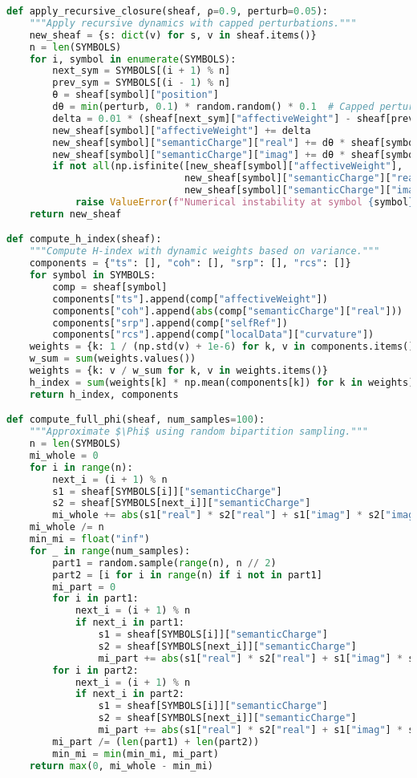 \documentclass[11pt]{article}
\begin{document}
\begin{lstlisting}[language=Python, basicstyle=\small\ttfamily, breaklines=true]
def apply_recursive_closure(sheaf, ρ=0.9, perturb=0.05):
    """Apply recursive dynamics with capped perturbations."""
    new_sheaf = {s: dict(v) for s, v in sheaf.items()}
    n = len(SYMBOLS)
    for i, symbol in enumerate(SYMBOLS):
        next_sym = SYMBOLS[(i + 1) % n]
        prev_sym = SYMBOLS[(i - 1) % n]
        θ = sheaf[symbol]["position"]
        dθ = min(perturb, 0.1) * random.random() * 0.1  # Capped perturbation
        delta = 0.01 * (sheaf[next_sym]["affectiveWeight"] - sheaf[prev_sym]["affectiveWeight"]) * np.cos(θ * ρ)
        new_sheaf[symbol]["affectiveWeight"] += delta
        new_sheaf[symbol]["semanticCharge"]["real"] += dθ * sheaf[symbol]["selfRef"]
        new_sheaf[symbol]["semanticCharge"]["imag"] += dθ * sheaf[symbol]["localData"]["curvature"]
        if not all(np.isfinite([new_sheaf[symbol]["affectiveWeight"],
                               new_sheaf[symbol]["semanticCharge"]["real"],
                               new_sheaf[symbol]["semanticCharge"]["imag"]])):
            raise ValueError(f"Numerical instability at symbol {symbol}")
    return new_sheaf

def compute_h_index(sheaf):
    """Compute H-index with dynamic weights based on variance."""
    components = {"ts": [], "coh": [], "srp": [], "rcs": []}
    for symbol in SYMBOLS:
        comp = sheaf[symbol]
        components["ts"].append(comp["affectiveWeight"])
        components["coh"].append(abs(comp["semanticCharge"]["real"]))
        components["srp"].append(comp["selfRef"])
        components["rcs"].append(comp["localData"]["curvature"])
    weights = {k: 1 / (np.std(v) + 1e-6) for k, v in components.items()}
    w_sum = sum(weights.values())
    weights = {k: v / w_sum for k, v in weights.items()}
    h_index = sum(weights[k] * np.mean(components[k]) for k in weights)
    return h_index, components

def compute_full_phi(sheaf, num_samples=100):
    """Approximate $\Phi$ using random bipartition sampling."""
    n = len(SYMBOLS)
    mi_whole = 0
    for i in range(n):
        next_i = (i + 1) % n
        s1 = sheaf[SYMBOLS[i]]["semanticCharge"]
        s2 = sheaf[SYMBOLS[next_i]]["semanticCharge"]
        mi_whole += abs(s1["real"] * s2["real"] + s1["imag"] * s2["imag"])
    mi_whole /= n
    min_mi = float("inf")
    for _ in range(num_samples):
        part1 = random.sample(range(n), n // 2)
        part2 = [i for i in range(n) if i not in part1]
        mi_part = 0
        for i in part1:
            next_i = (i + 1) % n
            if next_i in part1:
                s1 = sheaf[SYMBOLS[i]]["semanticCharge"]
                s2 = sheaf[SYMBOLS[next_i]]["semanticCharge"]
                mi_part += abs(s1["real"] * s2["real"] + s1["imag"] * s2["imag"])
        for i in part2:
            next_i = (i + 1) % n
            if next_i in part2:
                s1 = sheaf[SYMBOLS[i]]["semanticCharge"]
                s2 = sheaf[SYMBOLS[next_i]]["semanticCharge"]
                mi_part += abs(s1["real"] * s2["real"] + s1["imag"] * s2["imag"])
        mi_part /= (len(part1) + len(part2))
        min_mi = min(min_mi, mi_part)
    return max(0, mi_whole - min_mi)


\end{lstlisting}
\end{document}
